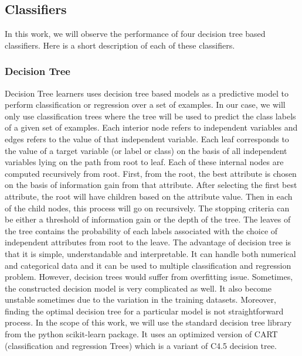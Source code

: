 \documentclass[sigplan]{acmart}\settopmatter{printfolios=true,printccs=false,printacmref=false}
\begin{document}
\subsection{Classifiers}
In this work, we will observe the performance of four decision tree based classifiers. Here is a short description of each of these classifiers.

\subsubsection{Decision Tree}
Decision Tree learners uses decision tree based models as a predictive model to perform classification or regression over a set of examples. In our case, we will only use classification trees where the tree will be used to predict the class labels of a given set of examples. Each interior node refers to independent variables and edges refers to the value of that independent variable. Each leaf corresponds to the value of a target variable (or label or class) on the basis of all independent variables lying on the path from root to leaf. Each of these internal nodes are computed recursively from root. First, from the root, the best attribute is chosen on the basis of information gain from that attribute. After selecting the first best attribute, the root will have children based on the attribute value. Then in each of the child nodes, this process will go on recursively. The stopping criteria can be either a threshold of information gain or the depth of the tree. The leaves of the tree contains the probability of each labels associated with the choice of independent attributes from root to the leave. The advantage of decision tree is that it is simple, understandable and interpretable. It can handle both numerical and categorical data and it can be used to multiple classification and regression problem. However, decision trees would suffer from overfitting issue. Sometimes, the constructed decision model is very complicated as well. It also become unstable sometimes due to the variation in the training datasets. Moreover, finding the optimal decision tree for a particular model is not straightforward process. In the scope of this work, we will use the standard decision tree library from the python scikit-learn package. It uses an optimized version of CART (classification and regression Trees) which is a variant of C4.5 decision tree. 
\end{document}
